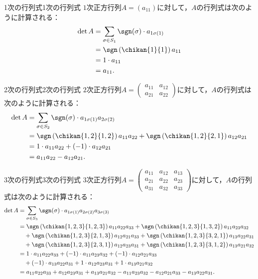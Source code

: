 \begin{example}{1次の行列式}{1次の行列式}
  $1$次正方行列$A = (a_{11})$に対して，$A$の行列式は次のように計算される：
  \begin{align*}
    \det A &= \sum_{\sigma \in S_1} \sgn(\sigma) \cdot a_{1\sigma(1)} \\
    &= \sgn\left( \chikan{1}{1} \right) a_{11} \\
    &= 1 \cdot a_{11} \\
    &= a_{11}.
  \end{align*}
\end{example}

\begin{example}{2次の行列式}{2次の行列式}
  $2$次正方行列$A = \begin{pmatrix} a_{11} & a_{12} \\ a_{21} & a_{22} \end{pmatrix}$に対して，$A$の行列式は次のように計算される：
  \begin{align*}
    \det A &= \sum_{\sigma \in S_2} \sgn(\sigma) \cdot a_{1\sigma(1)} a_{2\sigma(2)} \\
    &= \sgn\left( \chikan{1, 2}{1, 2} \right) a_{11} a_{22} + \sgn\left( \chikan{1, 2}{2, 1} \right) a_{12} a_{21} \\
    &= 1 \cdot a_{11} a_{22} + (-1) \cdot a_{12} a_{21} \\
    &= a_{11} a_{22} - a_{12} a_{21}.
  \end{align*}
\end{example}

\begin{example}{3次の行列式}{3次の行列式}
  $3$次正方行列$A = \begin{pmatrix} a_{11} & a_{12} & a_{13} \\ a_{21} & a_{22} & a_{23} \\ a_{31} & a_{32} & a_{33} \end{pmatrix}$に対して，$A$の行列式は次のように計算される：
  \begin{align*}
    \det A &= \sum_{\sigma \in S_3} \sgn(\sigma) \cdot  a_{1\sigma(1)} a_{2\sigma(2)} a_{3\sigma(3)} \\
    &= \sgn\left( \chikan{1, 2, 3}{1, 2, 3} \right) a_{11} a_{22} a_{33} + \sgn\left( \chikan{1, 2, 3}{1, 3, 2} \right) a_{11} a_{23} a_{32} \\
    &\quad + \sgn\left( \chikan{1, 2, 3}{2, 1, 3} \right) a_{12} a_{21} a_{33} + \sgn\left( \chikan{1, 2, 3}{3, 2, 1} \right) a_{13} a_{22} a_{31} \\
    &\quad + \sgn\left( \chikan{1, 2, 3}{2, 3, 1} \right) a_{12} a_{23} a_{31} + \sgn\left( \chikan{1, 2, 3}{3, 1, 2} \right) a_{13} a_{21} a_{32} \\
    &= 1 \cdot a_{11} a_{22} a_{33} + (-1) \cdot a_{11} a_{23} a_{32} + (-1) \cdot a_{12} a_{21} a_{33} \\
    &\quad + (-1) \cdot a_{13} a_{22} a_{31} + 1 \cdot a_{12} a_{23} a_{31} + 1 \cdot a_{13} a_{21} a_{32} \\
    &= a_{11} a_{22} a_{33} + a_{12} a_{23} a_{31} + a_{13} a_{21} a_{32} - a_{11} a_{23} a_{32} - a_{12} a_{21} a_{33} - a_{13} a_{22} a_{31}.
  \end{align*}
\end{example}

